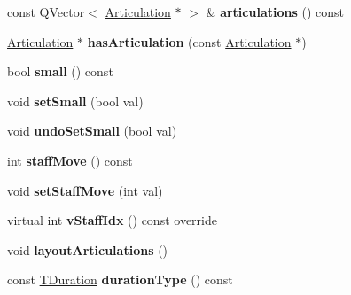 \begin{DoxyCompactItemize}
\item 
\mbox{\label{class_ms_1_1_chord_rest_a1e84bb0c5cbb2359c684030b1508741d}} 
const Q\+Vector$<$ \hyperlink{class_ms_1_1_articulation}{Articulation} $\ast$ $>$ \& {\bfseries articulations} () const
\item 
\mbox{\label{class_ms_1_1_chord_rest_aeaf0bdf0b56de93a593f9a70e5e2cd49}} 
\hyperlink{class_ms_1_1_articulation}{Articulation} $\ast$ {\bfseries has\+Articulation} (const \hyperlink{class_ms_1_1_articulation}{Articulation} $\ast$)
\item 
\mbox{\label{class_ms_1_1_chord_rest_a260e9896d5323993e2ba87c40f60d5ce}} 
bool {\bfseries small} () const
\item 
\mbox{\label{class_ms_1_1_chord_rest_a2c1a9c099f5bd7aa4889202975aa8b02}} 
void {\bfseries set\+Small} (bool val)
\item 
\mbox{\label{class_ms_1_1_chord_rest_adbc83de8c01b1afd07b9d2805a7cd6f5}} 
void {\bfseries undo\+Set\+Small} (bool val)
\item 
\mbox{\label{class_ms_1_1_chord_rest_a11c815063edf5abc1bff515e11b03a2b}} 
int {\bfseries staff\+Move} () const
\item 
\mbox{\label{class_ms_1_1_chord_rest_a9129693fc48621402f0ea332bb589e21}} 
void {\bfseries set\+Staff\+Move} (int val)
\item 
\mbox{\label{class_ms_1_1_chord_rest_a7b344ea7b12893001b693d782d19a081}} 
virtual int {\bfseries v\+Staff\+Idx} () const override
\item 
\mbox{\label{class_ms_1_1_chord_rest_acb577f9dd2eaa0306bf647004ed09a2e}} 
void {\bfseries layout\+Articulations} ()
\item 
\mbox{\label{class_ms_1_1_chord_rest_a4c0205b5940976cc9f7cb9eb543fbc08}} 
const \hyperlink{class_ms_1_1_t_duration}{T\+Duration} {\bfseries duration\+Type} () const
\item 

\end{DoxyCompactItemize}
